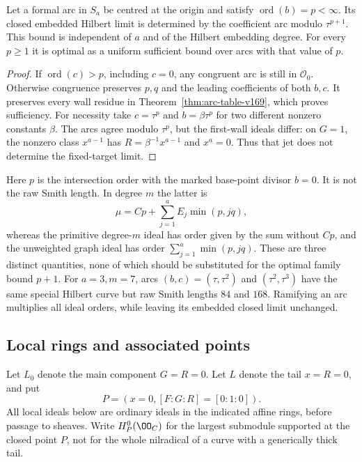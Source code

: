 \begin{theorem}
\label{thm:sharp-jet-v169}
Let a formal arc in $S_a$ be centred at the origin and satisfy
$\operatorname{ord}(b)=p<\infty$. Its closed embedded Hilbert limit is
determined by the coefficient arc modulo $\tau^{p+1}$. This bound
is independent of $a$ and of the Hilbert embedding degree. For every
$p\geq1$ it is optimal as a uniform sufficient bound over arcs with
that value of $p$.
\end{theorem}
\begin{proof}
If $\operatorname{ord}(c)>p$, including $c=0$, any congruent arc is
still in $\mathcal O_0$. Otherwise congruence preserves $p,q$ and the
leading coefficients of both $b,c$. It preserves every wall residue
in Theorem~\ref{thm:arc-table-v169}, which proves sufficiency.
For necessity take $c=\tau^p$ and $b=\beta\tau^p$ for two different
nonzero constants $\beta$. The arcs agree modulo $\tau^p$, but the
first-wall ideals differ: on $G=1$, the nonzero class $x^{a-1}$ has
$R=\beta^{-1}x^{a-1}$ and $x^a=0$. Thus that jet does not determine
the fixed-target limit.
\end{proof}
Here $p$ is the intersection order with the marked base-point divisor
$b=0$. It is not the raw Smith length. In degree $m$ the latter is
\begin{equation}\label{eq:raw-order-v169}
 \mu=Cp+\sum_{j=1}^aE_j\min(p,jq),
\end{equation}
whereas the primitive degree-$m$ ideal has order given by the sum
without $Cp$, and the unweighted graph ideal has order
$\sum_{j=1}^a\min(p,jq)$. These are three distinct quantities, none
of which should be substituted for the optimal family bound $p+1$.
For $a=3,m=7$, arcs $(b,c)=(\tau,\tau^2)$ and
$(\tau^2,\tau^3)$ have the same special Hilbert curve but raw Smith
lengths $84$ and $168$. Ramifying an arc multiplies all ideal orders,
while leaving its embedded closed limit unchanged.

\subsection{Local rings and associated points}
Let $L_0$ denote the main component $G=R=0$. Let $L$ denote the tail
$x=R=0$, and put
\[
 P=(x=0,[F:G:R]=[0:1:0]).
\]
All local ideals below are ordinary ideals in the indicated affine
rings, before passage to sheaves. Write $H^0_P(\OO_C)$ for the
largest submodule supported at the closed point $P$, not for the
whole nilradical of a curve with a generically thick tail.

